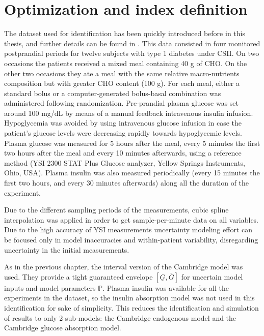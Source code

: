 \section{Optimization and index definition}
\label{sec:OptimizationAndIndexDefinition}
	
The dataset used for identification has been quickly introduced before in this thesis, and further details can be found in \cite{paoloibolus2012}. This data consisted in four monitored postprandial periods for twelve subjects with type 1 diabetes under CSII. On two occasions the patients received a mixed meal containing 40 g of CHO. On the other two occasions they ate a meal with the same relative macro-nutrients composition but with greater CHO content (100 g). For each meal, either a standard bolus or a computer-generated bolus-basal combination was administered following randomization. Pre-prandial plasma glucose was set around 100 mg/dL by means of a manual feedback intravenous insulin infusion. Hypoglycemia was avoided by using intravenous glucose infusion in case the patient's glucose levels were decreasing rapidly towards hypoglycemic levels. Plasma glucose was measured for 5 hours after the meal, every 5 minutes the first two hours after the meal and every 10 minutes afterwards, using a reference method (YSI 2300 STAT Plus Glucose analyzer, Yellow Springs Instruments, Ohio, USA). Plasma insulin was also measured periodically (every 15 minutes the first two hours, and every 30 minutes afterwards) along all the duration of the experiment. 

Due to the different sampling periods of the measurements, cubic spline interpolation was applied in order to get sample-per-minute data on all variables. Due to the high accuracy of YSI measurements \cite{nowotny2012precision} uncertainty modeling effort can be focused only in model inaccuracies and within-patient variability, disregarding uncertainty in the initial measurements.

As in the previous chapter, the interval version of the Cambridge model \cite{calm2010comparison,de2012prediction} was used. They provide a tight guaranteed envelope $[\underline{G} ,\overline{G}]$ for uncertain model inputs and model parameters $\mathbb{P}$. Plasma insulin was available for all the experiments in the dataset, so the insulin absorption model was not used in this identification for sake of simplicity. This reduces the identification and simulation of results to only 2 sub-models: the Cambridge endogenous model and the Cambridge glucose absorption model.

